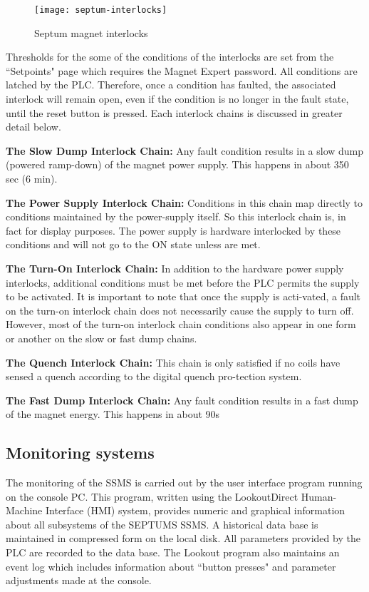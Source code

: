 {\begin{figure}[tbp]
\begin{center}
\texttt{[image: septum-interlocks]}
\caption[Septum: Interlocks]{Septum magnet interlocks}  
\label{fig:septum-inter}
\end{center}
\end{figure}


Thresholds for the some of the conditions of the interlocks are set from the ``Setpoints" page which requires 
the Magnet Expert password.  All conditions are latched by the PLC.  Therefore, once a condition has faulted, 
the associated interlock will remain open, even if the condition is no longer in the fault state, until the 
reset button is pressed.  Each interlock chains is discussed in greater detail below.


{\bf The Slow Dump Interlock Chain:}
Any fault condition results in a slow dump (powered ramp-down) of the magnet power supply.  This happens 
in about 350 sec (6 min).


{\bf The Power Supply Interlock Chain:}
Conditions in this chain map directly to conditions maintained by the power-supply itself.  So this interlock 
chain is, in fact for display purposes.  The power supply is hardware interlocked by these conditions and will 
not go to the ON state unless are met. 


{\bf The Turn-On Interlock Chain:}
In addition to the hardware power supply interlocks, additional conditions must be met before the PLC permits 
the supply to be activated.  It is important to note that once the supply is acti-vated, a fault on the turn-on 
interlock chain does not necessarily cause the supply to turn off.  However, most of the turn-on interlock 
chain conditions also appear in one form or another on the slow or fast dump chains.


{\bf The Quench Interlock Chain:}
This chain is only satisfied if no coils have sensed a quench according to the digital quench pro-tection system.


{\bf The Fast Dump Interlock Chain:}
Any fault condition results in a fast dump of the magnet energy.  This happens in about 90s

\subsection {\bf Monitoring systems}

The monitoring of the SSMS is carried out by the user interface program running on the 
console PC.  This program, written using the LookoutDirect Human-Machine Interface (HMI) system, provides 
numeric and graphical information about all subsystems of the SEPTUMS SSMS.  A historical data base is 
maintained in compressed form on the local disk.  All parameters provided by the PLC are recorded to the 
data base.  The Lookout program also maintains an event log which includes information about ``button presses" 
and parameter adjustments made at the console.

}
